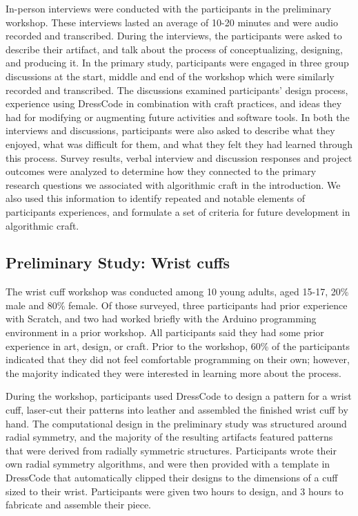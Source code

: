 \documentclass{sigchi}
\begin{document}
In-person interviews were conducted with the participants in the preliminary workshop. These interviews lasted an average of 10-20 minutes and were audio recorded and transcribed. During the interviews, the participants were asked to describe their artifact, and talk about the process of conceptualizing, designing, and producing it. In the primary study, participants were engaged in three group discussions at the start, middle and end of the workshop which were similarly recorded and transcribed. The discussions examined participants' design process, experience using DressCode in combination with craft practices, and ideas they had for modifying or augmenting future activities and software tools. In both the interviews and discussions, participants were also asked to describe what they enjoyed, what was difficult for them, and what they felt they had learned through this process. Survey results, verbal interview and discussion responses and project outcomes were analyzed to determine how they connected to the primary research questions we associated with algorithmic craft in the introduction. We also used this information to identify repeated and notable elements of participants experiences, and formulate a set of criteria for future development in algorithmic craft.

\subsection{Preliminary Study: Wrist cuffs}
The wrist cuff workshop was conducted among 10 young adults, aged 15-17, 20\% male and 80\% female. Of those surveyed, three participants had prior experience with Scratch, and two had worked briefly with the Arduino programming environment in a prior workshop. All participants said they had some prior experience in art, design, or craft. Prior to the workshop, 60\% of the participants indicated that they did not feel comfortable programming on their own; however, the majority indicated they were interested in learning more about the process. 

During the workshop, participants used DressCode to design a pattern for a wrist cuff, laser-cut their patterns into leather and assembled the finished wrist cuff by hand. The computational design in the preliminary study was structured around radial symmetry, and the majority of the resulting artifacts featured patterns that were derived from radially symmetric structures. Participants wrote their own radial symmetry algorithms, and were then provided with a template in DressCode that automatically clipped their designs to the dimensions of a cuff sized to their wrist. Participants were given two hours to design, and 3 hours to fabricate and assemble their piece.
\end{document}
